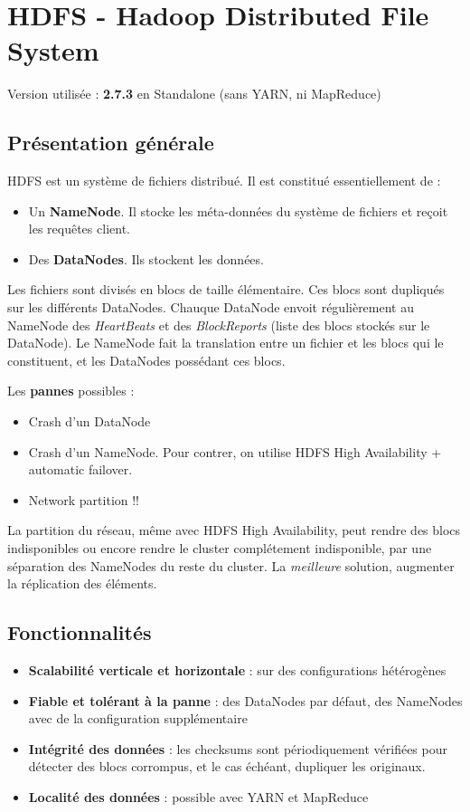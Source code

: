 \section{HDFS - Hadoop Distributed File System}

Version utilisée : \textbf{2.7.3} en Standalone (sans YARN, ni MapReduce)

\subsection{Présentation générale}

HDFS est un système de fichiers distribué. Il est constitué essentiellement de :

\begin{itemize}
	\item Un \textbf{NameNode}. Il stocke les méta-données du système de fichiers et reçoit les requêtes client.
	\item Des \textbf{DataNodes}. Ils stockent les données.
\end{itemize}

Les fichiers sont divisés en blocs de taille élémentaire. Ces blocs sont dupliqués sur les différents DataNodes. Chauque DataNode envoit régulièrement au NameNode des \textit{HeartBeats} et des \textit{BlockReports} (liste des blocs stockés sur le DataNode). Le NameNode fait la translation entre un fichier et les blocs qui le constituent, et les DataNodes possédant ces blocs.

Les \textbf{pannes} possibles :

\begin{itemize}
	\item Crash d'un DataNode
	\item Crash d'un NameNode. Pour contrer, on utilise HDFS High Availability + automatic failover.
	\item Network partition !!
\end{itemize}

La partition du réseau, même avec HDFS High Availability, peut rendre des blocs indisponibles ou encore rendre le cluster complétement indisponible, par une séparation des NameNodes du reste du cluster. La \textit{meilleure} solution, augmenter la réplication des éléments.

\subsection{Fonctionnalités}

\begin{itemize}
	\item \textbf{Scalabilité verticale et horizontale} : sur des configurations hétérogènes
	\item \textbf{Fiable et tolérant à la panne} : des DataNodes par défaut, des NameNodes avec de la configuration supplémentaire
	\item \textbf{Intégrité des données} : les checksums sont périodiquement vérifiées pour détecter des blocs corrompus, et le cas échéant, dupliquer les originaux.
	\item \textbf{Localité des données} : possible avec YARN et MapReduce
\end{itemize}

